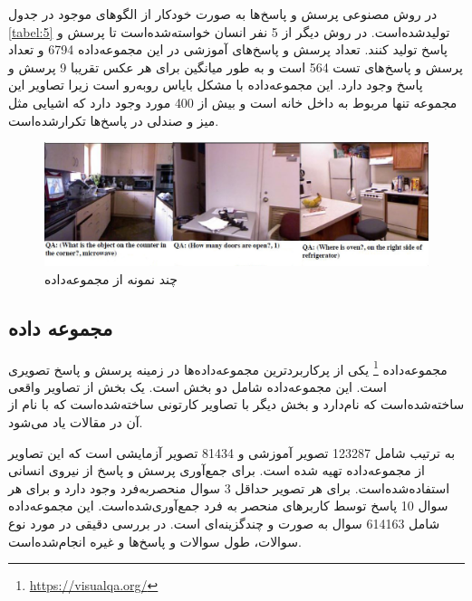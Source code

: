  در روش مصنوعی پرسش و پاسخ‌ها به صورت خودکار از الگوهای موجود در جدول
 \ref{tabel:5}
  تولید‌شده‌است. در روش دیگر از 5 نفر انسان خواسته‌شده‌است تا پرسش و پاسخ تولید کنند. تعداد پرسش و پاسخ‌های آموزشی در این مجموعه‌داده 6794 و تعداد پرسش و پاسخ‌های تست 564 است و به طور میانگین برای هر عکس تقریبا 9 پرسش و پاسخ وجود دارد. این مجموعه‌داده با مشکل بایاس روبه‌رو است زیرا تصاویر این مجموعه تنها مربوط به داخل خانه است و بیش از 400 مورد وجود دارد که اشیایی مثل میز و صندلی در پاسخ‌ها تکرارشده‌است.
  
  \begin{figure}[h]
  	\centerline{\includegraphics[scale=0.5]{images/DAQUAR.jpg}}
  	\caption[چند نمونه از مجموعه‌داده ]{چند نمونه از مجموعه‌داده  \cite{malinowski2014multi}}
  	\label{fig:DAQUARExample}
  \end{figure}

\subsection[مجموعه داده \lr{VQA}]{مجموعه داده  \cite{antol2015vqa} \cite{goyal2017making}}

مجموعه‌داده
 \footnote{\href{https://visualqa.org/}{https://visualqa.org/}}
یکی از پرکاربردترین مجموعه‌داده‌ها در زمینه پرسش و پاسخ تصویری است. این مجموعه‌داده شامل دو بخش است. یک بخش از تصاویر واقعی ساخته‌شده‌است که
 نام‌دارد و بخش دیگر با تصاویر کارتونی ساخته‌شده‌است که با نام 
 از آن در مقالات یاد می‌شود.
 
 به ترتیب شامل 123287 تصویر آموزشی و 81434 تصویر آزمایشی است که این تصاویر از مجموعه‌داده
 \cite{lin2014microsoft}
  تهیه شده است.  برای جمع‌آوری پرسش و پاسخ از نیروی انسانی استفاده‌شده‌است. برای هر تصویر حداقل 3 سوال منحصربه‌فرد وجود دارد و برای هر سوال 10 پاسخ توسط کاربرهای منحصر به فرد جمع‌آوری‌شده‌است. این مجموعه‌داده شامل 614163 سوال به صورت 
  و چندگزینه‌ای است. در 
  \cite{antol2015vqa}
  بررسی دقیقی در مورد نوع سوالات، طول سوالات و پاسخ‌ها و غیره انجام‌شده‌است.
  
